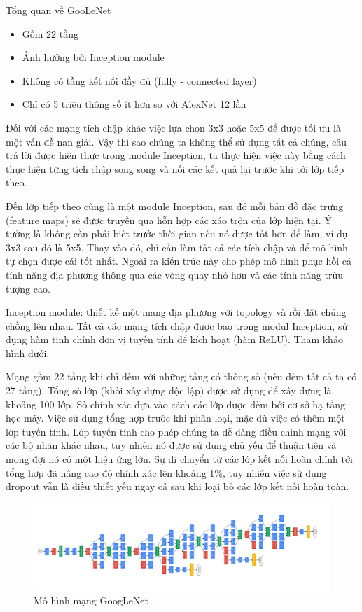 Tổng quan về GooLeNet \cite{gglenet}
\begin{itemize}
\item Gồm 22 tầng
\item Ảnh hưởng bởi Inception module
\item Không có tầng kết nối đầy đủ (fully - connected layer)
\item Chỉ có 5 triệu thông số ít hơn so với AlexNet 12 lần
\end{itemize}


Đối với các mạng tích chập khác việc lựa chọn 3x3 hoặc 5x5 để được tối ưu là một vấn đề nan giải. Vậy thì sao chúng ta không thể sử dụng tất cả chúng, câu trả lời được hiện thực trong module Inception, ta thực hiện việc này bằng cách thực hiện từng tích chập song song và nối các kết quả lại trước khi tới lớp tiếp theo.

Đến lớp tiếp theo cũng là một module Inception, sau đó mỗi bản đồ đặc trưng (feature maps) sẽ được truyền qua hỗn hợp các xáo trộn của lớp  hiện tại. Ý tưởng là không cần phải biết trước thời gian nếu nó được tốt hơn để làm, ví dụ 3x3 sau đó là 5x5. Thay vào đó, chỉ cần làm tất cả các tích chập và để mô hình tự chọn được cái tốt nhất. Ngoài ra kiến trúc này cho phép mô hình phục hồi cả tính năng địa phương thông qua các vòng quay nhỏ hơn và các tính năng trừu tượng cao.

Inception module: thiết kế một mạng địa phương với topology và rồi đặt chúng chồng lên nhau. Tất cả các mạng tích chập được bao trong modul Inception, sử dụng hàm tinh chỉnh  đơn vị tuyến tính để kích hoạt (hàm ReLU). Tham khảo hình dưới.

Mạng gồm 22 tầng khi chỉ đếm với những tầng có thông số (nếu đếm tất cả ta có 27 tầng). Tổng số lớp (khối xây dựng độc lập) được sử dụng để xây dựng là khoảng 100 lớp. Số chính xác dựa vào cách các lớp được đếm bởi cơ sở hạ tầng học máy. Việc sử dụng tổng hợp trước khi phân loại, mặc dù việc có thêm một lớp tuyến tính. Lớp tuyến tính cho phép chúng ta dễ dàng điều chỉnh mạng với các bộ nhãn khác nhau, tuy nhiên nó được sử dụng chủ yếu để thuận tiện và mong đợi nó có một hiệu ứng lớn. Sự di chuyển từ các lớp kết nối hoàn chỉnh tới tổng hợp đã nâng cao độ chính xác lên khoảng 1\%, tuy nhiên việc sử dụng dropout vẫn là điều thiết yếu ngay cả sau khi loại bỏ các lớp kết nối hoàn toàn. 

\begin{center}
    \begin{figure}[h!]
    \begin{center}
     \includegraphics[scale=0.5]{img/googlenet_diagram.png}
    \end{center}
    \caption{Mô hình mạng GoogLeNet \cite{gglenet}}
    \label{refhinh12}
    \end{figure}
\end{center}

